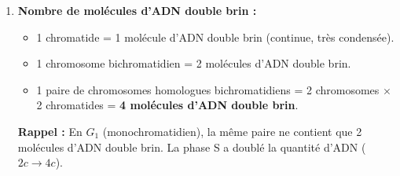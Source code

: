 \documentclass[11pt]{article}
\begin{document}
\begin{exoresolu}
\begin{enumerate}
\begin{itemize}
            \item \textbf{Paire homologue (Cellule en $G_2$/Métaphase) :} Génotype cellulaire $[A//a]$ (hétérozygote). 4 chromatides au total : $A, A, a, a$.
        \end{itemize}
    \item \textbf{Nombre de molécules d'ADN double brin :} 
        \begin{itemize}
            \item 1 chromatide = 1 molécule d'ADN double brin (continue, très condensée).
            \item 1 chromosome bichromatidien = 2 molécules d'ADN double brin.
            \item 1 paire de chromosomes homologues bichromatidiens = 2 chromosomes $\times$ 2 chromatides = \textbf{4 molécules d'ADN double brin}.
        \end{itemize}
        \textbf{Rappel :} En $G_1$ (monochromatidien), la même paire ne contient que 2 molécules d'ADN double brin. La phase S a doublé la quantité d'ADN ($2c \rightarrow 4c$).
\end{enumerate}
\end{exoresolu}
\end{document}
